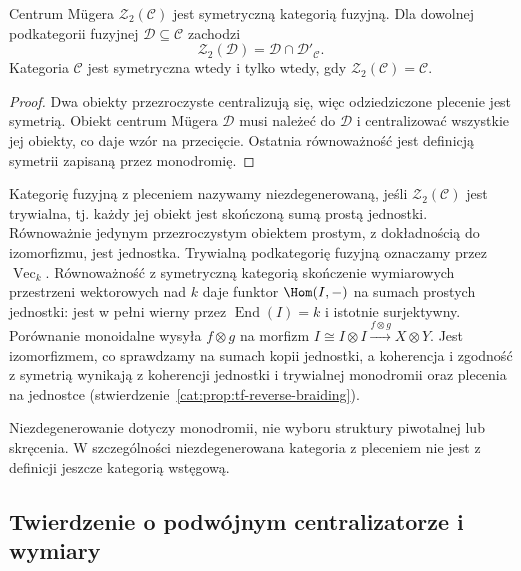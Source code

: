 \begin{wniosek}\label{cat:cor:tf-muger-symmetric}
Centrum Mügera $\mathcal Z_2(\mathcal C)$ jest symetryczną kategorią fuzyjną. Dla dowolnej podkategorii fuzyjnej $\mathcal D\subseteq\mathcal C$ zachodzi
\[
 \mathcal Z_2(\mathcal D)=\mathcal D\cap\mathcal D'_{\mathcal C}.
\]
Kategoria $\mathcal C$ jest symetryczna wtedy i tylko wtedy, gdy $\mathcal Z_2(\mathcal C)=\mathcal C$.
\end{wniosek}
\begin{proof}
Dwa obiekty przezroczyste centralizują się, więc odziedziczone plecenie jest symetrią. Obiekt centrum Mügera $\mathcal D$ musi należeć do $\mathcal D$ i centralizować wszystkie jej obiekty, co daje wzór na przecięcie. Ostatnia równoważność jest definicją symetrii zapisaną przez monodromię.
\end{proof}

\begin{definicja}\label{cat:def:tf-nondegenerate}
Kategorię fuzyjną z pleceniem nazywamy niezdegenerowaną, jeśli $\mathcal Z_2(\mathcal C)$ jest trywialna, tj. każdy jej obiekt jest skończoną sumą prostą jednostki. Równoważnie jedynym przezroczystym obiektem prostym, z dokładnością do izomorfizmu, jest jednostka. Trywialną podkategorię fuzyjną oznaczamy przez $\operatorname{Vec}_k$. Równoważność z symetryczną kategorią skończenie wymiarowych przestrzeni wektorowych nad $k$ daje funktor $\Hom(I,-)$ na sumach prostych jednostki: jest w pełni wierny przez $\operatorname{End}(I)=k$ i istotnie surjektywny. Porównanie monoidalne wysyła $f\otimes g$ na morfizm $I\cong I\otimes I\xrightarrow{f\otimes g}X\otimes Y$. Jest izomorfizmem, co sprawdzamy na sumach kopii jednostki, a koherencja i zgodność z symetrią wynikają z koherencji jednostki i trywialnej monodromii oraz plecenia na jednostce (stwierdzenie~\ref{cat:prop:tf-reverse-braiding}).
\end{definicja}

Niezdegenerowanie dotyczy monodromii, nie wyboru struktury piwotalnej lub skręcenia. W szczególności niezdegenerowana kategoria z pleceniem nie jest z definicji jeszcze kategorią wstęgową.

\subsection{Twierdzenie o podwójnym centralizatorze i wymiary}

